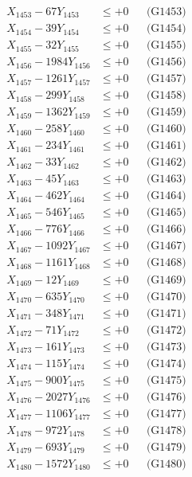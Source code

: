 \documentclass[a4paper,10pt]{article}
\begin{document}
{\begin{align}
X_{1453} - 67Y_{1453} &\leq +0 && \text{(G1453)} \\
X_{1454} - 39Y_{1454} &\leq +0 && \text{(G1454)} \\
X_{1455} - 32Y_{1455} &\leq +0 && \text{(G1455)} \\
X_{1456} - 1984Y_{1456} &\leq +0 && \text{(G1456)} \\
X_{1457} - 1261Y_{1457} &\leq +0 && \text{(G1457)} \\
X_{1458} - 299Y_{1458} &\leq +0 && \text{(G1458)} \\
X_{1459} - 1362Y_{1459} &\leq +0 && \text{(G1459)} \\
X_{1460} - 258Y_{1460} &\leq +0 && \text{(G1460)} \\
\allowbreak
X_{1461} - 234Y_{1461} &\leq +0 && \text{(G1461)} \\
X_{1462} - 33Y_{1462} &\leq +0 && \text{(G1462)} \\
X_{1463} - 45Y_{1463} &\leq +0 && \text{(G1463)} \\
X_{1464} - 462Y_{1464} &\leq +0 && \text{(G1464)} \\
X_{1465} - 546Y_{1465} &\leq +0 && \text{(G1465)} \\
X_{1466} - 776Y_{1466} &\leq +0 && \text{(G1466)} \\
X_{1467} - 1092Y_{1467} &\leq +0 && \text{(G1467)} \\
X_{1468} - 1161Y_{1468} &\leq +0 && \text{(G1468)} \\
X_{1469} - 12Y_{1469} &\leq +0 && \text{(G1469)} \\
X_{1470} - 635Y_{1470} &\leq +0 && \text{(G1470)} \\
\allowbreak
X_{1471} - 348Y_{1471} &\leq +0 && \text{(G1471)} \\
X_{1472} - 71Y_{1472} &\leq +0 && \text{(G1472)} \\
X_{1473} - 161Y_{1473} &\leq +0 && \text{(G1473)} \\
X_{1474} - 115Y_{1474} &\leq +0 && \text{(G1474)} \\
X_{1475} - 900Y_{1475} &\leq +0 && \text{(G1475)} \\
X_{1476} - 2027Y_{1476} &\leq +0 && \text{(G1476)} \\
X_{1477} - 1106Y_{1477} &\leq +0 && \text{(G1477)} \\
X_{1478} - 972Y_{1478} &\leq +0 && \text{(G1478)} \\
X_{1479} - 693Y_{1479} &\leq +0 && \text{(G1479)} \\
X_{1480} - 1572Y_{1480} &\leq +0 && \text{(G1480)} \\

\end{align}}
\end{document}
